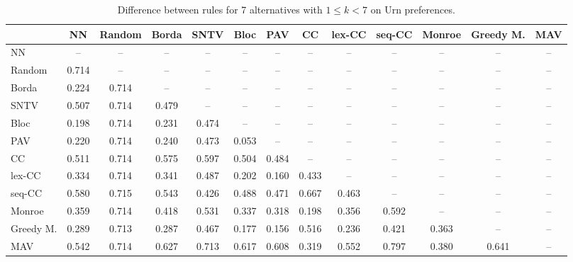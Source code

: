 
\begin{table*}[h!]
\centering
\begin{tabular}{lcccccccccccc}
\toprule
 & NN & Random & Borda & SNTV & Bloc & PAV & CC & lex-CC & seq-CC & Monroe & Greedy M. & MAV \\
\midrule
NN & -- & -- & -- & -- & -- & -- & -- & -- & -- & -- & -- & -- \\
Random & 0.714 & -- & -- & -- & -- & -- & -- & -- & -- & -- & -- & -- \\
Borda & 0.224 & 0.714 & -- & -- & -- & -- & -- & -- & -- & -- & -- & -- \\
SNTV & 0.507 & 0.714 & 0.479 & -- & -- & -- & -- & -- & -- & -- & -- & -- \\
Bloc & 0.198 & 0.714 & 0.231 & 0.474 & -- & -- & -- & -- & -- & -- & -- & -- \\
PAV & 0.220 & 0.714 & 0.240 & 0.473 & 0.053 & -- & -- & -- & -- & -- & -- & -- \\
CC & 0.511 & 0.714 & 0.575 & 0.597 & 0.504 & 0.484 & -- & -- & -- & -- & -- & -- \\
lex-CC & 0.334 & 0.714 & 0.341 & 0.487 & 0.202 & 0.160 & 0.433 & -- & -- & -- & -- & -- \\
seq-CC & 0.580 & 0.715 & 0.543 & 0.426 & 0.488 & 0.471 & 0.667 & 0.463 & -- & -- & -- & -- \\
Monroe & 0.359 & 0.714 & 0.418 & 0.531 & 0.337 & 0.318 & 0.198 & 0.356 & 0.592 & -- & -- & -- \\
Greedy M. & 0.289 & 0.713 & 0.287 & 0.467 & 0.177 & 0.156 & 0.516 & 0.236 & 0.421 & 0.363 & -- & -- \\
MAV & 0.542 & 0.714 & 0.627 & 0.713 & 0.617 & 0.608 & 0.319 & 0.552 & 0.797 & 0.380 & 0.641 & -- \\
\bottomrule
\end{tabular}

\caption{Difference between rules for 7 alternatives with $1 \leq k < 7$ on Urn preferences.}
\end{table*}
